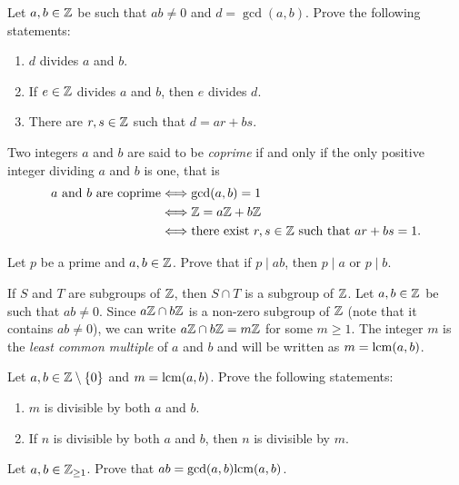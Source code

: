 \begin{exercise}
Let $a,b\in\mathbb{Z}$ be such that $ab\ne0$ and $d=\gcd(a,b)$. 
Prove the following statements:
\begin{enumerate}
\item $d$ divides $a$ and $b$.
\item If $e\in\mathbb{Z}$ divides $a$ and $b$, then $e$ divides $d$.
\item There are $r,s\in\mathbb{Z}$ such that $d=ar+bs$.
\end{enumerate}
\end{exercise}

Two integers $a$ and $b$ are said to be \emph{coprime} if 
and only if the only positive integer dividing 
$a$ and $b$ is one, that is  
\begin{align*}
a\text{ and }b\text{ are coprime}&\Longleftrightarrow \gcd(a,b)=1\\
&\Longleftrightarrow \mathbb{Z}=a\mathbb{Z}+b\mathbb{Z}\\
&\Longleftrightarrow \text{there exist $r,s\in\mathbb{Z}$ such that $ar+bs=1$.}
\end{align*}

\begin{exercise}
        Let $p$ be a prime and 
        $a,b\in\mathbb{Z}$. Prove that if $p\mid ab$, 
        then $p\mid a$ or $p\mid b$.
\end{exercise}

If $S$ and $T$ are subgroups of $\mathbb{Z}$, then $S\cap T$
is a subgroup of $\mathbb{Z}$.
Let $a,b\in\mathbb{Z}$ be such that $ab\ne 0$. Since $a\mathbb{Z}\cap b\mathbb{Z}$ 
is a non-zero subgroup of $\mathbb{Z}$ (note that it contains $ab\ne 0$), 
we can write  $a\mathbb{Z}\cap b\mathbb{Z}=m\mathbb{Z}$
for some $m\geq1$. The integer $m$
is the \emph{least common multiple} of $a$ and $b$ 
and will be written as $m=\mathrm{lcm}(a,b)$.

\begin{exercise}
Let $a,b\in\mathbb{Z}\setminus\{0\}$ and $m=\mathrm{lcm}(a,b)$. 
Prove the following statements:
\begin{enumerate}
        \item $m$ is divisible by both $a$ and $b$.
        \item If $n$ is divisible by both $a$ and $b$, then 
        $n$ is divisible by $m$.
\end{enumerate}
\end{exercise}

\begin{exercise}
Let $a,b\in\mathbb{Z}_{\geq1}$. Prove that 
$ab=\gcd(a,b)\mathrm{lcm}(a,b)$.
\end{exercise}

